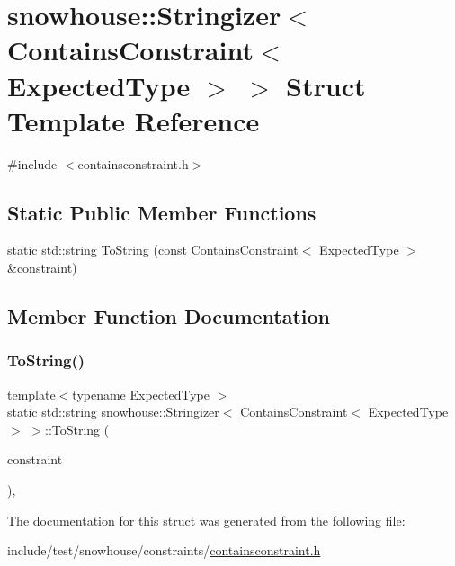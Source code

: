 \hypertarget{structsnowhouse_1_1Stringizer_3_01ContainsConstraint_3_01ExpectedType_01_4_01_4}{}\section{snowhouse\+::Stringizer$<$ Contains\+Constraint$<$ Expected\+Type $>$ $>$ Struct Template Reference}
\label{structsnowhouse_1_1Stringizer_3_01ContainsConstraint_3_01ExpectedType_01_4_01_4}


{\ttfamily \#include $<$containsconstraint.\+h$>$}

\subsection*{Static Public Member Functions}
\begin{DoxyCompactItemize}
\item 
static std\+::string \mbox{\hyperlink{structsnowhouse_1_1Stringizer_3_01ContainsConstraint_3_01ExpectedType_01_4_01_4_a9952feec5e16eab979ca17d3fc51ff2a}{To\+String}} (const \mbox{\hyperlink{structsnowhouse_1_1ContainsConstraint}{Contains\+Constraint}}$<$ Expected\+Type $>$ \&constraint)
\end{DoxyCompactItemize}


\subsection{Member Function Documentation}
\mbox{\label{structsnowhouse_1_1Stringizer_3_01ContainsConstraint_3_01ExpectedType_01_4_01_4_a9952feec5e16eab979ca17d3fc51ff2a}} 
\subsubsection{\texorpdfstring{ToString()}{ToString()}}
{\footnotesize\ttfamily template$<$typename Expected\+Type $>$ \\
static std\+::string \mbox{\hyperlink{structsnowhouse_1_1Stringizer}{snowhouse\+::\+Stringizer}}$<$ \mbox{\hyperlink{structsnowhouse_1_1ContainsConstraint}{Contains\+Constraint}}$<$ Expected\+Type $>$ $>$\+::To\+String (\begin{DoxyParamCaption}\item[{const \mbox{\hyperlink{structsnowhouse_1_1ContainsConstraint}{Contains\+Constraint}}$<$ Expected\+Type $>$ \&}]{constraint }\end{DoxyParamCaption})\hspace{0.3cm}{\ttfamily [inline]}, {\ttfamily [static]}}



The documentation for this struct was generated from the following file\+:\begin{DoxyCompactItemize}
\item 
include/test/snowhouse/constraints/\mbox{\hyperlink{containsconstraint_8h}{containsconstraint.\+h}}\end{DoxyCompactItemize}
